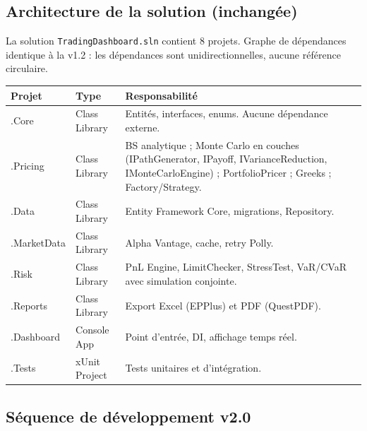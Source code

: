 \documentclass[a4paper,11pt]{article}
\begin{document}
\subsection{Architecture de la solution (inchang\'ee)}

La solution \texttt{TradingDashboard.sln} contient 8 projets. Graphe de d\'ependances
identique \`a la v1.2 : les d\'ependances sont unidirectionnelles, aucune r\'ef\'erence
circulaire.

\begin{center}
\begin{tabularx}{\textwidth}{>{\ttfamily}l l X}
\toprule
\textbf{Projet} & \textbf{Type} & \textbf{Responsabilit\'e} \\
\midrule
.Core       & Class Library  & Entit\'es, interfaces, enums. Aucune d\'ependance externe. \\
.Pricing    & Class Library  & BS analytique ; Monte Carlo en couches (IPathGenerator,
                               IPayoff, IVarianceReduction, IMonteCarloEngine) ;
                               PortfolioPricer ; Greeks ; Factory/Strategy. \\
.Data       & Class Library  & Entity Framework Core, migrations, Repository. \\
.MarketData & Class Library  & Alpha Vantage, cache, retry Polly. \\
.Risk       & Class Library  & PnL Engine, LimitChecker, StressTest, VaR/CVaR
                               avec simulation conjointe. \\
.Reports    & Class Library  & Export Excel (EPPlus) et PDF (QuestPDF). \\
.Dashboard  & Console App    & Point d'entr\'ee, DI, affichage temps r\'eel. \\
.Tests      & xUnit Project  & Tests unitaires et d'int\'egration. \\
\bottomrule
\end{tabularx}
\end{center}

\subsection{S\'equence de d\'eveloppement v2.0}
\end{document}
